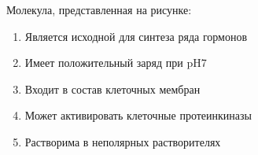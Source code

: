 
Молекула, представленная на рисунке:


\begin{enumerate}
    \item Является исходной для синтеза ряда гормонов
    \item Имеет положительный заряд при pH7
    \item Входит в состав клеточных мембран
    \item Может активировать клеточные протеинкиназы
    \item Растворима в неполярных растворителях
\end{enumerate}




